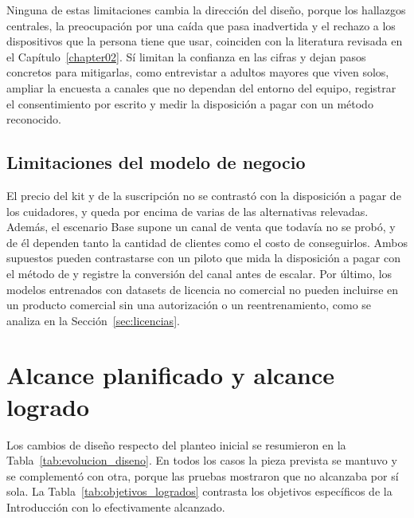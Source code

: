Ninguna de estas limitaciones cambia la dirección del diseño, porque los hallazgos centrales, la preocupación por una caída que pasa inadvertida y el rechazo a los dispositivos que la persona tiene que usar, coinciden con la literatura revisada en el Capítulo~\ref{chapter02}.
Sí limitan la confianza en las cifras y dejan pasos concretos para mitigarlas, como entrevistar a adultos mayores que viven solos, ampliar la encuesta a canales que no dependan del entorno del equipo, registrar el consentimiento por escrito y medir la disposición a pagar con un método reconocido.

\subsection{Limitaciones del modelo de negocio}

El precio del kit y de la suscripción no se contrastó con la disposición a pagar de los cuidadores, y queda por encima de varias de las alternativas relevadas.
Además, el escenario Base supone un canal de venta que todavía no se probó, y de él dependen tanto la cantidad de clientes como el costo de conseguirlos.
Ambos supuestos pueden contrastarse con un piloto que mida la disposición a pagar con el método de \textcite{VanWestendorp1976} y registre la conversión del canal antes de escalar.
Por último, los modelos entrenados con datasets de licencia no comercial no pueden incluirse en un producto comercial sin una autorización o un reentrenamiento, como se analiza en la Sección~\ref{sec:licencias}.

\section{Alcance planificado y alcance logrado}
\label{sec:alcance_logrado}

Los cambios de diseño respecto del planteo inicial se resumieron en la Tabla~\ref{tab:evolucion_diseno}.
En todos los casos la pieza prevista se mantuvo y se complementó con otra, porque las pruebas mostraron que no alcanzaba por sí sola.
La Tabla~\ref{tab:objetivos_logrados} contrasta los objetivos específicos de la Introducción con lo efectivamente alcanzado.


